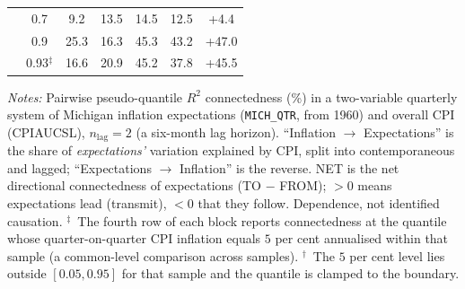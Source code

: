 \begin{table}[!ht]
\begin{threeparttable}
\begin{tabular}{l c c c c c c}
 & 0.7 & 9.2 & 13.5 & 14.5 & 12.5 & +4.4 \\
 & 0.9 & 25.3 & 16.3 & 45.3 & 43.2 & +47.0 \\
 & 0.93$^{\ddagger}$ & 16.6 & 20.9 & 45.2 & 37.8 & +45.5 \\
\bottomrule
\end{tabular}
\begin{tablenotes}[flushleft]\footnotesize
\item \textit{Notes:} Pairwise pseudo-quantile $R^2$ connectedness (\%) in a two-variable quarterly system of Michigan inflation expectations (\texttt{MICH\_QTR}, from 1960) and overall CPI (CPIAUCSL), $n_{\text{lag}}=2$ (a six-month lag horizon). ``Inflation $\to$ Expectations'' is the share of \emph{expectations'} variation explained by CPI, split into contemporaneous and lagged; ``Expectations $\to$ Inflation'' is the reverse. NET is the net directional connectedness of expectations (TO $-$ FROM); $>0$ means expectations lead (transmit), $<0$ that they follow. Dependence, not identified causation. $^{\ddagger}$~The fourth row of each block reports connectedness at the quantile whose quarter-on-quarter CPI inflation equals $5$ per cent annualised within that sample (a common-level comparison across samples). $^{\dagger}$~The $5$ per cent level lies outside $[0.05,0.95]$ for that sample and the quantile is clamped to the boundary.
\end{tablenotes}
\end{threeparttable}
\end{table}

